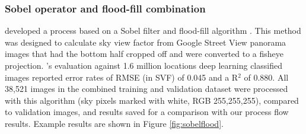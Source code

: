 \documentclass[final,3p,times,authoryear]{elsarticle}
\begin{document}
\subsubsection{Sobel operator and flood-fill combination}\label{sec:floodfill}

\cite{Middel2018} developed a process based on a Sobel filter and flood-fill algorithm \citep{Sobel1968,Laungrungthip2008,Middel2017}. This method was designed to calculate sky view factor from Google Street View panorama images that had the bottom half cropped off and were converted to a fisheye projection. \cite{Middel2018}'s evaluation against 1.6 million locations deep learning classified images reported error rates of RMSE (in SVF) of 0.045 and a R$^{2}$ of 0.880. All 38,521 images in the combined training and validation dataset were processed with this algorithm (sky pixels marked with white, RGB 255,255,255), compared to validation images, and results saved for a comparison with our process flow results.  Example results are shown in Figure \ref{fig:sobelflood}. 
\end{document}
